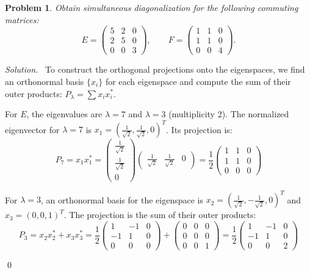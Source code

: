 \documentclass[12pt,a4paper]{article}
\newenvironment{solution}{%
  \par\noindent\textit{Solution.}\ }{\qed}
\theoremstyle{problemstyle}
\newtheorem{problem}{Problem}[section]
\begin{document}
\begin{problem}\label{prob:5-9}
Obtain simultaneous diagonalization for the following commuting matrices:
\[
  E = \begin{pmatrix} 5 & 2 & 0 \\ 2 & 5 & 0 \\ 0 & 0 & 3 \end{pmatrix}, \qquad
  F = \begin{pmatrix} 1 & 1 & 0 \\ 1 & 1 & 0 \\ 0 & 0 & 4 \end{pmatrix}.
\]
\end{problem}
\begin{solution}
To construct the orthogonal projections onto the eigenspaces, we find an orthonormal basis \( \{x_i\} \) for each eigenspace and compute the sum of their outer products: \( P_{\lambda} = \sum x_i x_i^* \).

For \( E \), the eigenvalues are \( \lambda = 7 \) and \( \lambda = 3 \) (multiplicity 2).
The normalized eigenvector for \( \lambda = 7 \) is \( x_1 = (\frac{1}{\sqrt{2}}, \frac{1}{\sqrt{2}}, 0)^T \). Its projection is:
\[ P_7 = x_1 x_1^* = \begin{pmatrix} \frac{1}{\sqrt{2}} \\ \frac{1}{\sqrt{2}} \\ 0 \end{pmatrix} \begin{pmatrix} \frac{1}{\sqrt{2}} & \frac{1}{\sqrt{2}} & 0 \end{pmatrix} = \frac{1}{2}\begin{pmatrix} 1 & 1 & 0 \\ 1 & 1 & 0 \\ 0 & 0 & 0 \end{pmatrix} \]

For \( \lambda = 3 \), an orthonormal basis for the eigenspace is \( x_2 = (\frac{1}{\sqrt{2}}, -\frac{1}{\sqrt{2}}, 0)^T \) and \( x_3 = (0, 0, 1)^T \). The projection is the sum of their outer products:
\[ P_3 = x_2 x_2^* + x_3 x_3^* = \frac{1}{2}\begin{pmatrix} 1 & -1 & 0 \\ -1 & 1 & 0 \\ 0 & 0 & 0 \end{pmatrix} + \begin{pmatrix} 0 & 0 & 0 \\ 0 & 0 & 0 \\ 0 & 0 & 1 \end{pmatrix} = \frac{1}{2}\begin{pmatrix} 1 & -1 & 0 \\ -1 & 1 & 0 \\ 0 & 0 & 2 \end{pmatrix} \]


\end{solution}
\end{document}
